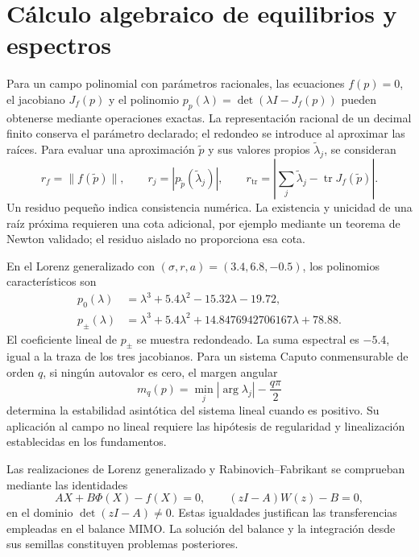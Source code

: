 \section{Cálculo algebraico de equilibrios y espectros}
\label{app:algebra-espectros}

Para un campo polinomial con parámetros racionales, las ecuaciones
\(f(p)=0\), el jacobiano \(J_f(p)\) y el polinomio
\(p_p(\lambda)=\det(\lambda I-J_f(p))\) pueden obtenerse mediante
operaciones exactas. La representación racional de un decimal finito conserva
el parámetro declarado; el redondeo se introduce al aproximar las raíces.
Para evaluar una aproximación \(\widetilde p\) y sus valores propios
\(\widetilde\lambda_j\), se consideran
\[
 r_f=\|f(\widetilde p)\|,\qquad
 r_j=|p_{\widetilde p}(\widetilde\lambda_j)|,\qquad
 r_{\mathrm{tr}}=
 \left|\sum_j\widetilde\lambda_j-\operatorname{tr}J_f(\widetilde p)\right|.
\]
Un residuo pequeño indica consistencia numérica. La existencia y unicidad de
una raíz próxima requieren una cota adicional, por ejemplo mediante un
teorema de Newton validado; el residuo aislado no proporciona esa cota.

En el Lorenz generalizado con
\((\sigma,r,a)=(3.4,6.8,-0.5)\), los polinomios característicos son
\begin{align*}
 p_0(\lambda)&=\lambda^3+5.4\lambda^2-15.32\lambda-19.72,\\
 p_{\pm}(\lambda)&=\lambda^3+5.4\lambda^2
 +14.8476942706167\lambda+78.88.
\end{align*}
El coeficiente lineal de \(p_\pm\) se muestra redondeado. La suma espectral
es \(-5.4\), igual a la traza de los tres jacobianos. Para un sistema Caputo
conmensurable de orden \(q\), si ningún autovalor es cero, el margen angular
\[
 m_q(p)=\min_j|\arg\lambda_j|-\frac{q\pi}{2}
\]
determina la estabilidad asintótica del sistema lineal cuando es positivo.
Su aplicación al campo no lineal requiere las hipótesis de regularidad y
linealización establecidas en los fundamentos.

Las realizaciones de Lorenz generalizado y Rabinovich--Fabrikant se comprueban
mediante las identidades
\[
 AX+B\Phi(X)-f(X)=0,\qquad
 (zI-A)W(z)-B=0,
\]
en el dominio \(\det(zI-A)\ne0\). Estas igualdades justifican las
transferencias empleadas en el balance MIMO. La solución del balance y la
integración desde sus semillas constituyen problemas posteriores.

